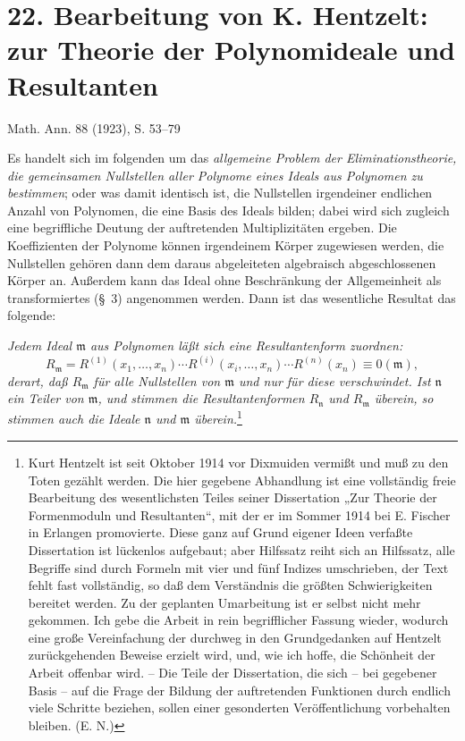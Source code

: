 \documentclass[11pt]{article}
\newcommand{\mideal}{\mathfrak m}
\newcommand{\nideal}{\mathfrak n}
\newcommand{\zero}[1]{\equiv 0(#1)}
\begin{document}
\setcounter{footnote}{0}

\section*{22. Bearbeitung von K. Hentzelt:\\ zur Theorie der Polynomideale und Resultanten}
\begin{center}
Math. Ann. 88 (1923), S. 53--79
\end{center}

Es handelt sich im folgenden um das \emph{allgemeine Problem der Eliminationstheorie, die gemeinsamen Nullstellen aller Polynome eines Ideals aus Polynomen zu bestimmen}; oder was damit identisch ist, die Nullstellen irgendeiner endlichen Anzahl von Polynomen, die eine Basis des Ideals bilden; dabei wird sich zugleich eine begriffliche Deutung der auftretenden Multiplizitäten ergeben. Die Koeffizienten der Polynome können irgendeinem Körper zugewiesen werden, die Nullstellen gehören dann dem daraus abgeleiteten algebraisch abgeschlossenen Körper an. Außerdem kann das Ideal ohne Beschränkung der Allgemeinheit als transformiertes (§~3) angenommen werden. Dann ist das wesentliche Resultat das folgende:

\emph{Jedem Ideal $\mideal$ aus Polynomen läßt sich eine Resultantenform zuordnen:}
\[
 R_{\mideal}=R^{(1)}(x_1,\ldots,x_n)\cdots
 R^{(i)}(x_i,\ldots,x_n)\cdots R^{(n)}(x_n)\zero{\mideal},
\]
\emph{derart, daß $R_{\mideal}$ für alle Nullstellen von $\mideal$ und nur für diese verschwindet. Ist $\nideal$ ein Teiler von $\mideal$, und stimmen die Resultantenformen $R_{\nideal}$ und $R_{\mideal}$ überein, so stimmen auch die Ideale $\nideal$ und $\mideal$ überein.}\footnote{Kurt Hentzelt ist seit Oktober 1914 vor Dixmuiden vermißt und muß zu den Toten gezählt werden. Die hier gegebene Abhandlung ist eine vollständig freie Bearbeitung des wesentlichsten Teiles seiner Dissertation „Zur Theorie der Formenmoduln und Resultanten“, mit der er im Sommer 1914 bei E. Fischer in Erlangen promovierte. Diese ganz auf Grund eigener Ideen verfaßte Dissertation ist lückenlos aufgebaut; aber Hilfssatz reiht sich an Hilfssatz, alle Begriffe sind durch Formeln mit vier und fünf Indizes umschrieben, der Text fehlt fast vollständig, so daß dem Verständnis die größten Schwierigkeiten bereitet werden. Zu der geplanten Umarbeitung ist er selbst nicht mehr gekommen. Ich gebe die Arbeit in rein begrifflicher Fassung wieder, wodurch eine große Vereinfachung der durchweg in den Grundgedanken auf Hentzelt zurückgehenden Beweise erzielt wird, und, wie ich hoffe, die Schönheit der Arbeit offenbar wird. -- Die Teile der Dissertation, die sich -- bei gegebener Basis -- auf die Frage der Bildung der auftretenden Funktionen durch endlich viele Schritte beziehen, sollen einer gesonderten Veröffentlichung vorbehalten bleiben. (E. N.)}
\end{document}
